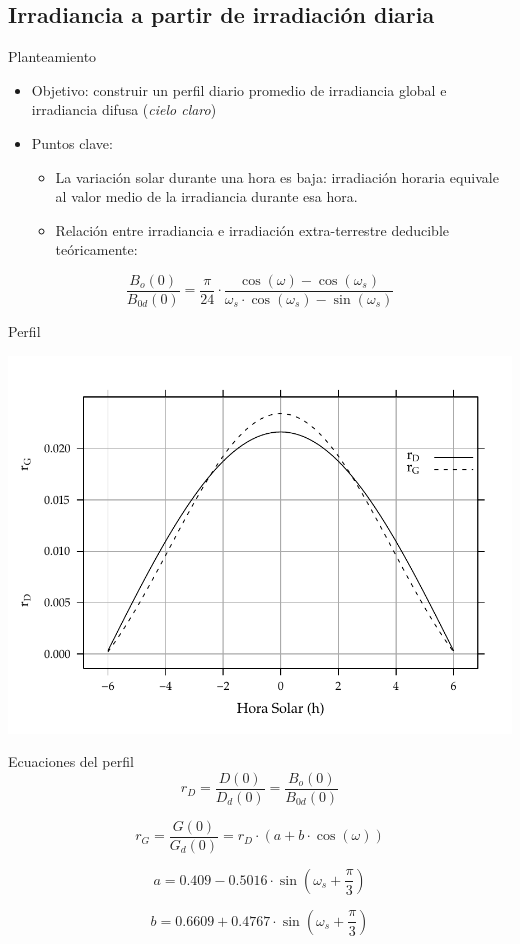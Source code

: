 \documentclass[xcolor={usenames,svgnames,dvipsnames}]{beamer}
\begin{document}
\subsection{Irradiancia a partir de irradiación diaria}
\label{sec:orge82f238}

\begin{frame}[label={sec:org4f3937f}]{Planteamiento}
\begin{itemize}
\item \alert{Objetivo}: construir un perfil diario promedio de irradiancia global e irradiancia difusa (\emph{cielo claro})
\item \alert{Puntos clave}:
\begin{itemize}
\item La variación solar durante una hora es baja: irradiación horaria equivale al valor medio de la irradiancia durante esa hora.
\item Relación entre irradiancia e irradiación extra-terrestre deducible teóricamente:
\end{itemize}
\end{itemize}

\[
\frac{B_{o}(0)}{B_{0d}(0)}=\frac{\pi}{24}\cdot\frac{\cos(\omega)-\cos(\omega_{s})}{\omega_{s}\cdot\cos(\omega_{s})-\sin(\omega_{s})}
\]
\end{frame}

\begin{frame}[label={sec:org165fb82}]{Perfil}
\begin{center}
\includegraphics[width=.9\linewidth]{../figs/RgRd.pdf}
\end{center}
\end{frame}

\begin{frame}[label={sec:orgccd20a9}]{Ecuaciones del perfil}
\[r_{D}=\frac{D(0)}{D_{d}(0)}=\frac{B_{o}(0)}{B_{0d}(0)}\]

\[r_{G}=\frac{G(0)}{G_{d}(0)}=r_{D}\cdot\left(a+b\cdot\cos(\omega)\right)\]

\[a=0.409-0.5016\cdot\sin(\omega_{s}+\frac{\pi}{3})\]

\[b=0.6609+0.4767\cdot\sin(\omega_{s}+\frac{\pi}{3})\]
\end{frame}
\end{document}

